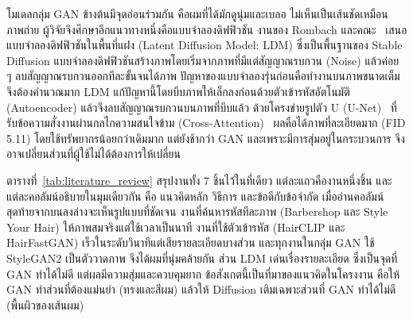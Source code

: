 โมเดลกลุ่ม GAN ข้างต้นมีจุดอ่อนร่วมกัน คือผมที่ได้มักดูนุ่มและเบลอ ไม่เห็นเป็นเส้นชัดเหมือนภาพถ่าย
ผู้วิจัยจึงศึกษาอีกแนวทางหนึ่งคือแบบจำลองดิฟฟิวชัน งานของ Rombach และคณะ~\cite{rombach2022highresolutionimagesynthesislatent}
เสนอแบบจำลองดิฟฟิวชันในพื้นที่แฝง (Latent Diffusion Model: LDM) ซึ่งเป็นพื้นฐานของ Stable Diffusion
แบบจำลองดิฟฟิวชันสร้างภาพโดยเริ่มจากภาพที่มีแต่สัญญาณรบกวน (Noise) แล้วค่อย ๆ ลบสัญญาณรบกวนออกทีละขั้นจนได้ภาพ
ปัญหาของแบบจำลองรุ่นก่อนคือทำงานบนภาพขนาดเต็ม จึงต้องคำนวณมาก
LDM แก้ปัญหานี้โดยบีบภาพให้เล็กลงก่อนด้วยตัวเข้ารหัสอัตโนมัติ (Autoencoder)
แล้วจึงลบสัญญาณรบกวนบนภาพที่บีบแล้ว ด้วยโครงข่ายรูปตัว U (U-Net)~\cite{ronneberger2015unetconvolutionalnetworksbiomedical}
ที่รับข้อความสั่งงานผ่านกลไกความสนใจข้าม (Cross-Attention)~\cite{vaswani2023attentionneed}
ผลคือได้ภาพที่ละเอียดมาก (FID 5.11) โดยใช้ทรัพยากรน้อยกว่าเดิมมาก
แต่ยังช้ากว่า GAN และเพราะมีการสุ่มอยู่ในกระบวนการ จึงอาจเปลี่ยนส่วนที่ผู้ใช้ไม่ได้ต้องการให้เปลี่ยน

ตารางที่~\ref{tab:literature_review} สรุปงานทั้ง 7 ชิ้นไว้ในที่เดียว
แต่ละแถวคืองานหนึ่งชิ้น และแต่ละคอลัมน์อธิบายในมุมเดียวกัน คือ แนวคิดหลัก วิธีการ และข้อดีกับข้อจำกัด
เมื่ออ่านคอลัมน์สุดท้ายจากบนลงล่างจะเห็นรูปแบบที่ชัดเจน
งานที่ค้นหารหัสทีละภาพ (Barbershop และ Style Your Hair) ให้ภาพสมจริงแต่ใช้เวลาเป็นนาที
งานที่ใช้ตัวเข้ารหัส (HairCLIP และ HairFastGAN) เร็วในระดับวินาทีแต่เสียรายละเอียดบางส่วน
และทุกงานในกลุ่ม GAN ใช้ StyleGAN2 เป็นตัววาดภาพ จึงได้ผมที่นุ่มคล้ายกัน
ส่วน LDM เด่นเรื่องรายละเอียด ซึ่งเป็นจุดที่ GAN ทำได้ไม่ดี แต่ผลมีความสุ่มและควบคุมยาก
ข้อสังเกตนี้เป็นที่มาของแนวคิดในโครงงาน คือให้ GAN ทำส่วนที่ต้องแม่นยำ (ทรงและสีผม)
แล้วให้ Diffusion เติมเฉพาะส่วนที่ GAN ทำได้ไม่ดี (พื้นผิวของเส้นผม)

